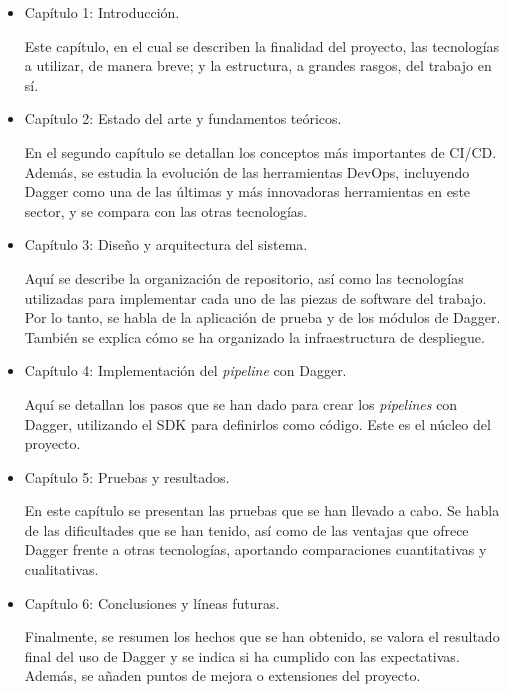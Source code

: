\begin{itemize}
  \item Capítulo 1: Introducción.

    Este capítulo, en el cual se describen la finalidad del proyecto, las tecnologías a utilizar, de manera breve; y la estructura, a grandes rasgos, del trabajo en sí.

  \item Capítulo 2: Estado del arte y fundamentos teóricos.

    En el segundo capítulo se detallan los conceptos más importantes de CI/CD. Además, se estudia la evolución de las herramientas DevOps\cite{devops}, incluyendo Dagger como una de las últimas y más innovadoras herramientas en este sector, y se compara con las otras tecnologías.
  \item Capítulo 3: Diseño y arquitectura del sistema.

    Aquí se describe la organización de repositorio, así como las tecnologías utilizadas para implementar cada uno de las piezas de software del trabajo. Por lo tanto, se habla de la aplicación de prueba y de los módulos de Dagger. También se explica cómo se ha organizado la infraestructura de despliegue.
  \item Capítulo 4: Implementación del \textit{pipeline} con Dagger.

    Aquí se detallan los pasos que se han dado para crear los \textit{pipelines} con Dagger, utilizando el SDK para definirlos como código. Este es el núcleo del proyecto.
  \item Capítulo 5: Pruebas y resultados.

    En este capítulo se presentan las pruebas que se han llevado a cabo. Se habla de las dificultades que se han tenido, así como de las ventajas que ofrece Dagger frente a otras tecnologías, aportando comparaciones cuantitativas y cualitativas.
  \item Capítulo 6: Conclusiones y líneas futuras.

    Finalmente, se resumen los hechos que se han obtenido, se valora el resultado final del uso de Dagger y se indica si ha cumplido con las expectativas. Además, se añaden puntos de mejora o extensiones del proyecto.
\end{itemize}

